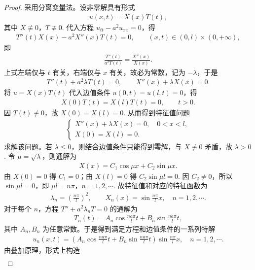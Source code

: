 \documentclass[../../main.tex]{subfiles}%
\begin{document}
\begin{proof}
采用分离变量法。设非零解具有形式
\begin{align*}
u(x,t)=X(x)T(t),
\end{align*}
其中 $X\not\equiv 0$，$T\not\equiv 0$. 代入方程 $u_{tt}-a^2u_{xx}=0$，得
\begin{align*}
T''(t)X(x)-a^2X''(x)T(t)=0,\qquad (x,t)\in(0,l)\times(0,+\infty),
\end{align*}
即
\begin{align*}
\frac{T''(t)}{a^2T(t)}=\frac{X''(x)}{X(x)}.
\end{align*}
上式左端仅与 $t$ 有关，右端仅与 $x$ 有关，故必为常数，记为 $-\lambda$，于是
\begin{align*}
T''(t)+a^2\lambda T(t)=0,\qquad X''(x)+\lambda X(x)=0.
\end{align*}
将 $u=X(x)T(t)$ 代入边值条件 $u(0,t)=u(l,t)=0$，得
\begin{align*}
X(0)T(t)=X(l)T(t)=0,\qquad t>0.
\end{align*}
因 $T(t)\not\equiv 0$，故 $X(0)=X(l)=0$. 从而得到特征值问题
\begin{align*}
\begin{cases}
X''(x)+\lambda X(x)=0,\quad 0<x<l,\\
X(0)=X(l)=0.
\end{cases}
\end{align*}
求解该问题。若 $\lambda\leqslant 0$，则结合边值条件只能得到零解，与 $X\not\equiv 0$ 矛盾，故 $\lambda>0$. 令 $\mu=\sqrt{\lambda}$，则通解为
\begin{align*}
X(x)=C_1\cos \mu x+C_2\sin \mu x.
\end{align*}
由 $X(0)=0$ 得 $C_1=0$；由 $X(l)=0$ 得 $C_2\sin \mu l=0$. 因 $C_2\neq 0$，所以 $\sin \mu l=0$，即 $\mu l=n\pi$，$n=1,2,\cdots$. 故特征值和对应的特征函数为
\begin{align*}
\lambda_n=\left(\frac{n\pi}{l}\right)^2,\qquad X_n(x)=\sin\frac{n\pi}{l}x,\quad n=1,2,\cdots.
\end{align*}
对于每个 $n$，方程 $T''+a^2\lambda_n T=0$ 的通解为
\begin{align*}
T_n(t)=A_n\cos\frac{na\pi}{l}t+B_n\sin\frac{na\pi}{l}t,
\end{align*}
其中 $A_n,B_n$ 为任意常数。于是得到满足方程和边值条件的一系列特解
\begin{align*}
u_n(x,t)=\left(A_n\cos\frac{na\pi}{l}t+B_n\sin\frac{na\pi}{l}t\right)\sin\frac{n\pi}{l}x,\quad n=1,2,\cdots.
\end{align*}
由叠加原理，形式上构造
\begin{align*}

\end{align*}
\end{proof}
\end{document}
